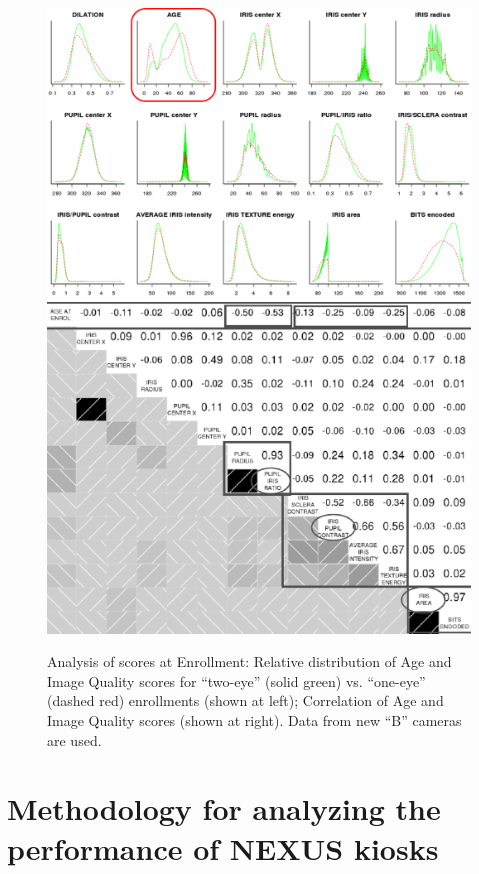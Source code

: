 \documentclass{cta-author}%
\begin{document}
\begin{figure}[!b]

\includegraphics[width=0.52\linewidth]{eps/en-iq-metrics-new.eps} \quad 
\includegraphics[width=0.45\linewidth]{eps/corr-enIQ.eps} 

\caption{Analysis of scores at Enrollment: 
Relative distribution of Age and Image Quality scores  for  ``two-eye'' (solid green) vs. ``one-eye'' (dashed red) enrollments (shown at left);
Correlation of Age and Image Quality scores (shown at right). 
Data from new ``B'' cameras are used. 
}
\label{fCorrelationAgeIQ}
\end{figure}



\section{Methodology for analyzing the performance of NEXUS kiosks}
\label{s.methodology}
\end{document}
